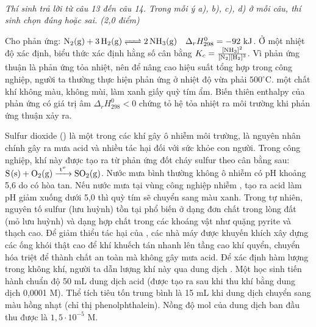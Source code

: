 \documentclass[11pt,a4paper]{article}
\begin{document}
\vspace{6pt}
 \\
\textit{Thí sinh trả lời từ câu 13 đến câu 14. Trong mỗi ý a), b), c), d) ở mỗi câu, thí sinh chọn đúng hoặc sai. (2,0 điểm)}
\vspace{4pt}

\begin{ex}
Cho phản ứng: $\ce{N2(g) + 3H2(g) <=> 2NH3(g)} \quad \Delta_r H^0_{298} = -92\text{ kJ}$.
\choiceTF
\True Ở một nhiệt độ xác định, biểu thức xác định hằng số cân bằng $K_c = \frac{[\ce{NH3}]^2}{[\ce{N2}][\ce{H2}]^3}$.
Vì phản ứng thuận là phản ứng tỏa nhiệt, nên để nâng cao hiệu suất tổng hợp  trong công nghiệp, người ta thường thực hiện phản ứng ở nhiệt độ vừa phải $500^\circ\text{C}$.
 một chất khí không màu, không mùi, làm xanh giấy quỳ tím ẩm.
\True Biến thiên enthalpy của phản ứng có giá trị âm $\Delta_r H^0_{298} < 0$ chứng tỏ hệ tỏa nhiệt ra môi trường khi phản ứng thuận xảy ra.
\loigiai{}
\end{ex}

\begin{ex}
Sulfur dioxide () là một trong các khí gây ô nhiễm môi trường, là nguyên nhân chính gây ra mưa acid và nhiều tác hại đối với sức khỏe con người. Trong công nghiệp, khí này được tạo ra từ phản ứng đốt cháy sulfur theo cân bằng sau: $\ce{S(s) + O2(g) ->[t^o] SO2(g)}$.
\choiceTF
Nước mưa bình thường không ô nhiễm có pH khoảng 5,6 do có  hòa tan. Nếu nước mưa tại vùng công nghiệp nhiễm , tạo ra acid  làm pH giảm xuống dưới 5,0 thì quỳ tím sẽ chuyển sang màu xanh.
\True Trong tự nhiên, nguyên tố sulfur (lưu huỳnh) tồn tại phổ biến ở dạng đơn chất trong lòng đất (mỏ lưu huỳnh) và dạng hợp chất trong các khoáng vật như quặng pyrite và thạch cao.
Để giảm thiểu tác hại của , các nhà máy được khuyến khích xây dựng các ống khói thật cao để khí  khuếch tán nhanh lên tầng cao khí quyển, chuyển hóa triệt để thành chất an toàn mà không gây mưa acid.
\True Để xác định hàm lượng  trong không khí, người ta dẫn lượng khí này qua dung dịch . Một học sinh tiến hành chuẩn độ 50 mL dung dịch acid  (được tạo ra sau khi thu khí  bằng dung dịch  0,0001 M). Thể tích  tiêu tốn trung bình là 15 mL khi dung dịch chuyển sang màu hồng nhạt (chỉ thị phenolphthalein). Nồng độ mol của dung dịch  ban đầu thu được là $1{,}5\cdot 10^{-5}\text{ M}$.
\loigiai{}
\end{ex}
\end{document}
